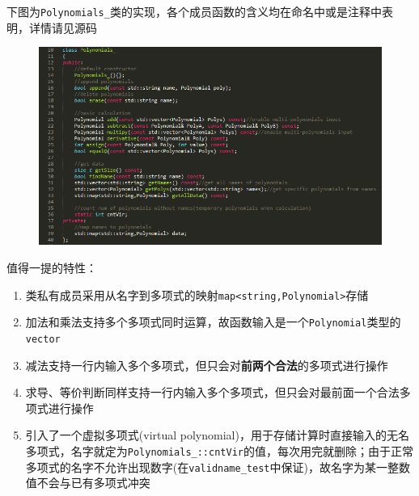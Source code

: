 \documentclass[11pt,UTF8]{ctexart}
\begin{document}
\bigskip
\par 下图为\verb'Polynomials_'类的实现，各个成员函数的含义均在命名中或是注释中表明，详情请见源码
\begin{figure}[H]
\centering
\includegraphics[width=\linewidth]{pic/class_polynomials.PNG}
\label{Fig:p2}
\end{figure}
\par 值得一提的特性：
\begin{enumerate}
	\item 类私有成员采用从名字到多项式的映射\verb'map<string,Polynomial>'存储
	\item 加法和乘法支持多个多项式同时运算，故函数输入是一个\verb'Polynomial'类型的\verb'vector'
	\item 减法支持一行内输入多个多项式，但只会对\textbf{前两个合法}的多项式进行操作
	\item 求导、等价判断同样支持一行内输入多个多项式，但只会对最前面一个合法多项式进行操作
	\item 引入了一个虚拟多项式(virtual polynomial)，用于存储计算时直接输入的无名多项式，名字就定为\verb'Polynomials_::cntVir'的值，每次用完就删除；由于正常多项式的名字不允许出现数字(在\verb'validname_test'中保证)，故名字为某一整数值不会与已有多项式冲突
\end{enumerate}
\end{document}
